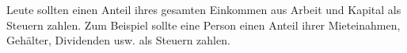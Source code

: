 Leute sollten einen Anteil ihres gesamten Einkommen aus Arbeit und Kapital als Steuern zahlen.
Zum Beispiel sollte eine Person einen Anteil ihrer Mieteinahmen, Gehälter, Dividenden usw. als Steuern zahlen.